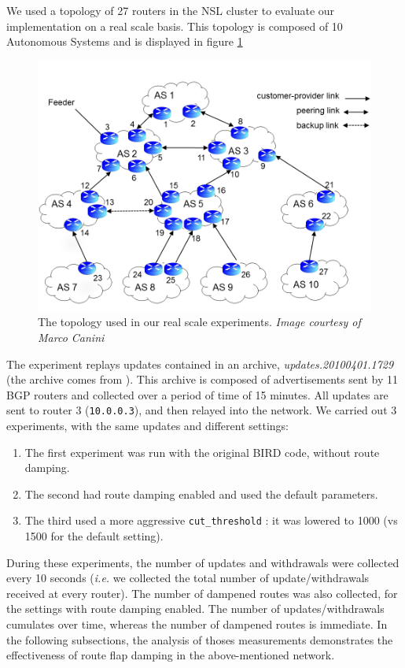 \documentclass[a4paper,english]{IEEEtran}
\begin{document}
We used a topology of 27 routers in the NSL cluster to evaluate our implementation on a real scale basis.
This topology is composed of 10 Autonomous Systems and is displayed in figure \ref{fig_topo}
\begin{figure}
\begin{center}
\includegraphics[scale=.3]{img/topology.png}
\end{center}
\caption{The topology used in our real scale experiments. \textit{Image courtesy of Marco Canini}}
\label{fig_topo}
\end{figure}

The experiment replays updates contained in an archive,
\textsl{updates.20100401.1729} (the archive comes from \cite{routeviews}).
This archive is composed of advertisements sent by 11 BGP routers and collected
over a period of time of 15 minutes.
All updates are sent to router 3 (\texttt{\small 10.0.0.3}), and then relayed into the network.
We carried out 3 experiments, with the same updates and different settings:

\begin{enumerate}
\item The first experiment was run with the original BIRD code, without route damping.
\item The second had route damping enabled and used the default parameters.
\item The third used a more aggressive \texttt{\small cut\_threshold} : 
it was lowered to 1000 (vs 1500 for the default setting).
\end{enumerate}

During these experiments, the number of updates and withdrawals were collected every 10 seconds 
(\textit{i.e.} we collected the total number of update/withdrawals received at every router).
The number of dampened routes was also collected, for the settings with route damping enabled.
The number of updates/withdrawals cumulates over time, whereas the number of dampened routes is immediate.
In the following subsections, the analysis of thoses measurements demonstrates the effectiveness
of route flap damping in the above-mentioned network.
\end{document}
